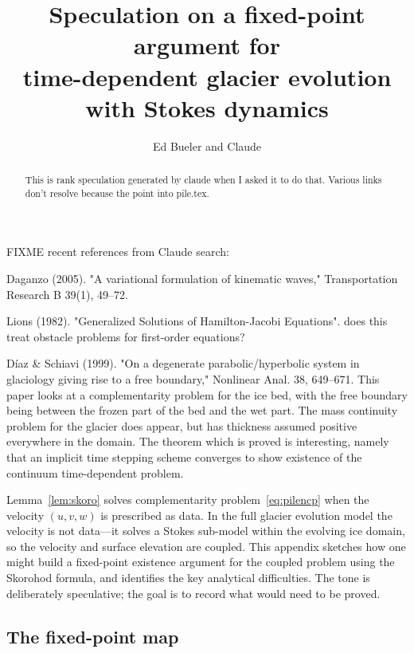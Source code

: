 \documentclass[hidelinks,onefignum,onetabnum,final]{siamart220329}  %
\title{Speculation on a fixed-point argument for \\ time-dependent glacier evolution with Stokes dynamics}
\author{Ed Bueler and Claude}
\begin{document}
\maketitle

\begin{abstract}
This is rank speculation generated by claude when I asked it to do that.  Various links don't resolve because the point into pile.tex.
\end{abstract}


FIXME recent references from Claude search:

Daganzo (2005). "A variational formulation of kinematic waves," Transportation Research B 39(1), 49--72.

Lions (1982). "Generalized Solutions of Hamilton-Jacobi Equations". does this treat obstacle problems for first-order equations?

Díaz \& Schiavi (1999). "On a degenerate parabolic/hyperbolic system in glaciology giving rise to a free boundary," Nonlinear Anal. 38, 649--671.  This paper looks at a complementarity problem for the ice bed, with the free boundary being between the frozen part of the bed and the wet part.  The mass continuity problem for the glacier does appear, but has thickness assumed positive everywhere in the domain.  The theorem which is proved is interesting, namely that an implicit time stepping scheme converges to show existence of the continuum time-dependent problem.

\bigskip

Lemma~\ref{lem:skoro} solves complementarity problem~\eqref{eq:pilencp}
when the velocity $(u,v,w)$ is prescribed as data.  In the full glacier
evolution model the velocity is not data---it solves a Stokes sub-model
within the evolving ice domain, so the velocity and surface elevation
are coupled.  This appendix sketches how one might build a fixed-point
existence argument for the coupled problem using the Skorohod formula,
and identifies the key analytical difficulties.  The tone is deliberately
speculative; the goal is to record what would need to be proved.

\subsection{The fixed-point map}
\end{document}
